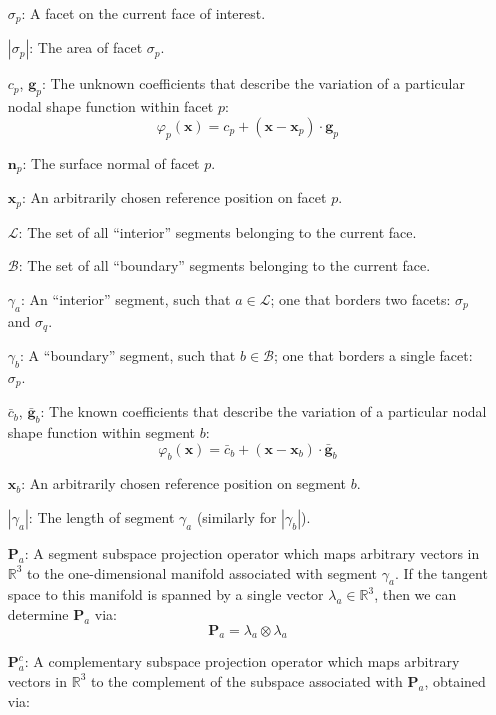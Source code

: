 \documentclass[11pt]{article} %
\begin{document}
\begin{itemize}
	\item[$\sigma_p$:] A facet on the current face of interest.
	\item[$| \sigma_p |$:] The area of facet $\sigma_p$.
	\item[$c_p$, $\mathbf{g}_p$:] The unknown coefficients that describe the variation of a particular nodal shape function within facet $p$:
	\begin{equation}
		\varphi_p (\mathbf{x}) = c_p + (\mathbf{x} - \mathbf{x}_p) \cdot \mathbf{g}_p
	\end{equation}
	\item[$\mathbf{n}_p$:] The surface normal of facet $p$.
	\item[$\mathbf{x}_p$:] An arbitrarily chosen reference position on facet $p$.
	\item[$\mathcal{L}$:] The set of all ``interior'' segments belonging to the current face.
	\item[$\mathcal{B}$:] The set of all ``boundary'' segments belonging to the current face.
	\item[$\gamma_a$:] An ``interior'' segment, such that $a \in \mathcal{L}$; one that borders two facets: $\sigma_p$ and $\sigma_q$.
	\item[$\gamma_b$:] A ``boundary'' segment, such that $b \in \mathcal{B}$; one that borders a single facet: $\sigma_p$.
	\item[$\bar{c}_b$, $\bar{\mathbf{g}}_b$:] The known coefficients that describe the variation of a particular nodal shape function within segment $b$:
	\begin{equation}
		\varphi_b (\mathbf{x}) = \bar{c}_b + (\mathbf{x} - \mathbf{x}_b) \cdot \bar{\mathbf{g}}_b
	\end{equation}
	\item[$\mathbf{x}_b$:] An arbitrarily chosen reference position on segment $b$.
	\item[$| \gamma_a |$:] The length of segment $\gamma_a$ (similarly for $| \gamma_b |$).
	\item[$\mathbf{P}_a$:] A segment subspace projection operator which maps arbitrary vectors in $\mathbb{R}^3$ to the one-dimensional manifold associated with segment $\gamma_a$. If the tangent space to this manifold is spanned by a single vector $\lambda_a \in \mathbb{R}^3$, then we can determine $\mathbf{P}_a$ via:
	\begin{equation}
		\mathbf{P}_a = \lambda_a \otimes \lambda_a
	\end{equation}
	\item[$\mathbf{P}^{c}_a$:] A complementary subspace projection operator which maps arbitrary vectors in $\mathbb{R}^3$ to the complement of the subspace associated with $\mathbf{P}_a$, obtained via:

\end{itemize}
\end{document}

